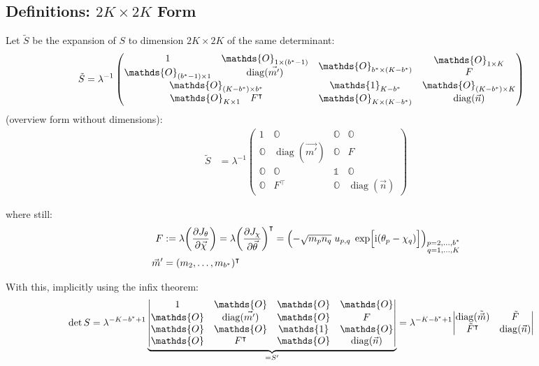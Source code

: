 \documentclass[
	english,
	a4paper,
	fontsize=10pt,
	parskip=half,
	titlepage=true,
	DIV=12,
	final
]{scrreprt}
\newcommand*{\transp}{\ensuremath{^\intercal}}
\newcommand*{\iunit}{\ensuremath{\mathrm{i}}}
\DeclareMathOperator{\diag}{diag}
\begin{document}
\subsection{Definitions: $2K \times 2K$ Form}
Let $\tilde{S}$ be the expansion of $S$ to dimension $2K \times 2K$ of the same determinant:
\begin{align}
	\tilde{S}
&=
	\lambda^{-1}
	\begin{pmatrix}
		\mqty{	1 & \mathds{O}_{1 \times (b^* - 1)} \\ 
				\mathds{O}_{(b^* - 1) \times 1} & \diag(\vec{m'})} &
		\mathds{O}_{b^* \times (K - b^*)}	& 
		\mqty{\mathds{O}_{1 \times K} \\ F}
	\\
		\mathds{O}_{(K - b^*) \times b^*}  &  \mathds{1}_{K - b^*}  &  \mathds{O}_{(K - b^*) \times K}
	\\
		\mqty{\mathds{O}_{K \times 1} & F\transp} & 
		\mathds{O}_{K \times (K - b^*)} & \diag(\vec{n})
	\end{pmatrix}
\end{align}
(overview form without dimensions):
\begin{align}
	\tilde{S}
&=
	\lambda^{-1}
	\begin{pmatrix}
		1			& \mathds{O} 		& \mathds{O}		& \mathds{O} \\
		\mathds{O}	& \diag(\vec{m'})	& \mathds{O}		& F          \\
		\mathds{O}	& \mathds{O}			& \mathds{1}		& \mathds{O} \\
		\mathds{O}	& F\transp			& \mathds{O}		& \diag(\vec{n})
	\end{pmatrix}
\end{align}

where still:
\begin{align}
	F
&:=
	\lambda \qty( \pdv{J_{\theta}}{\vec{\chi}} ) 
	= \lambda \qty( \pdv{J_{\chi}}{\vec{\theta}} )\transp
	= \qty( -\sqrt{m_p n_q} \; u_{p,q} \; \exp[\Big. \iunit(\theta_p - \chi_q)] )_{
		\substack{p = 2, \ldots, b^* \\ q = 1, \ldots, K}
	}
\label{eqn:DefDetOffDiagonalF}
\\
	\vec{m}'
&=
	(m_2, \ldots, m_{b^*})\transp
\end{align}

With this, implicitly using the infix theorem:
\begin{align}
	\det S
&=
	\lambda^{-K - b^* + 1}
	\underbrace{\mqty|
		1			& \mathds{O} 		& \mathds{O}		& \mathds{O} \\
		\mathds{O}	& \diag(\vec{m'})	& \mathds{O}		& F          \\
		\mathds{O}	& \mathds{O}			& \mathds{1}		& \mathds{O} \\
		\mathds{O}	& F\transp			& \mathds{O}		& \diag(\vec{n})
	|}_{= S'}
=
	\lambda^{-K - b^* + 1}
	\mqty|
		\diag(\tilde{\vec{m}})	& \tilde{F}			\\
		\tilde{F}\transp			& \diag(\vec{n})
	|
\label{eqn:detS_protoform}
\end{align}
\end{document}

